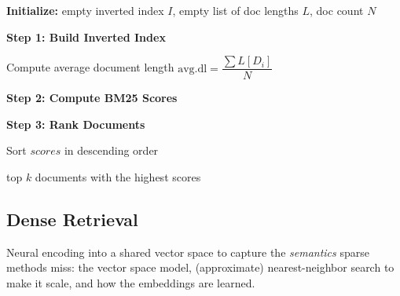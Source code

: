 \documentclass{article}
\begin{document}
\begin{algorithm}[ht]
\caption{BM25 Ranking: Ranking and Returning Results}
\label{alg:bm25}

\textbf{Initialize:} empty inverted index $I$, empty list of doc lengths $L$, doc count $N$\;
\BlankLine

\textbf{Step 1: Build Inverted Index}\;

Compute average document length $\mathrm{avg.dl} = \dfrac{\sum L[D_i]}{N}$
\BlankLine

\textbf{Step 2: Compute BM25 Scores}
\BlankLine

\textbf{Step 3: Rank Documents}\;

Sort $\mathit{scores}$ in descending order\;

\Return top $k$ documents with the highest scores\;
\end{algorithm}
 

\subsection{Dense Retrieval}
Neural encoding into a shared vector space to capture the \textit{semantics} sparse methods miss: the vector space model, (approximate) nearest-neighbor search to make it scale, and how the embeddings are learned.
\end{document}
